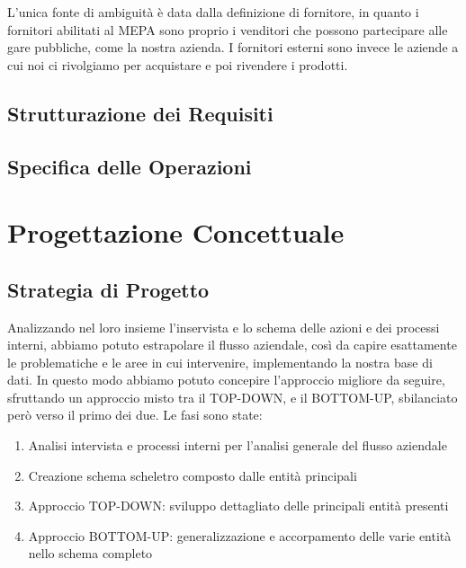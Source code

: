 \documentclass[12pt]{article} %
\begin{document}
		L'unica fonte di ambiguità è data dalla definizione di fornitore, in quanto i fornitori abilitati al MEPA sono proprio i venditori che possono partecipare alle gare pubbliche, come la nostra azienda. I fornitori esterni sono invece le aziende a cui noi ci rivolgiamo per acquistare e poi rivendere i prodotti.

		\subsection{Strutturazione dei Requisiti}

		

		\subsection{Specifica delle Operazioni}

		

		\newpage

	\section{Progettazione Concettuale}


		\subsection{Strategia di Progetto }
			Analizzando nel loro insieme l'inservista e lo schema delle azioni e dei processi interni, abbiamo potuto estrapolare il flusso aziendale, così da capire esattamente le problematiche e le aree in cui intervenire, implementando la nostra base di dati.\newline \newline
			In questo modo abbiamo potuto concepire l'approccio migliore da seguire, sfruttando un approccio misto tra il TOP-DOWN, e il BOTTOM-UP, sbilanciato però verso il primo dei due. Le  fasi sono state:
			\begin{enumerate}
			\item Analisi intervista e processi interni per l'analisi generale del flusso aziendale
			\item Creazione schema scheletro composto dalle entità principali
			\item Approccio TOP-DOWN: sviluppo dettagliato delle principali entità presenti
			\item Approccio BOTTOM-UP: generalizzazione e accorpamento delle varie entità nello schema completo
			\end{enumerate}
\end{document}
